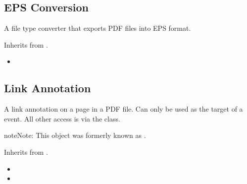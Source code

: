 \documentclass[letterpaper,12pt,english,openany,oneside]{sphinxmanual}
\begin{document}
\subsection{EPS Conversion}
\label{\detokenize{IAC_API_AppleEvtObjects:eps-conversion}}
A file type converter that exports PDF files into EPS format.


Inherits from  .

\label{\detokenize{IAC_API_AppleEvtObjects:related-methods-5}}
\begin{itemize}
\item {} 

\end{itemize}




\subsection{Link Annotation}
\label{\detokenize{IAC_API_AppleEvtObjects:link-annotation}}
A link annotation on a page in a PDF file. Can only be used as the target of a  event. All other access is via the  class.

\begin{sphinxadmonition}{note}{Note:}
This object was formerly known as  .
\end{sphinxadmonition}


Inherits from  .

\label{\detokenize{IAC_API_AppleEvtObjects:related-methods-6}}
\begin{itemize}
\item {} 

\item {} 

\end{itemize}
\end{document}
